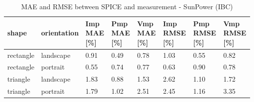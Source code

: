\begin{table}[htbp]
\centering
\caption{MAE and RMSE between SPICE and measurement - SunPower (IBC)}
\label{tab:mae_rmse_sunpower}
\begin{tabular}{@{}llllllll@{}}
\toprule
shape & orientation & Imp MAE [\%] & Pmp MAE [\%] & Vmp MAE [\%] & Imp RMSE [\%] & Pmp RMSE [\%] & Vmp RMSE [\%] \\
\midrule
rectangle & landscape & 0.91 & 0.49 & 0.78 & 1.03 & 0.55 & 0.82 \\
rectangle & portrait & 0.55 & 0.74 & 0.77 & 0.63 & 0.90 & 0.78 \\
triangle & landscape & 1.83 & 0.88 & 1.53 & 2.62 & 1.10 & 1.72 \\
triangle & portrait & 1.79 & 1.02 & 2.51 & 2.45 & 1.16 & 3.35 \\
\bottomrule
\end{tabular}
\end{table}
